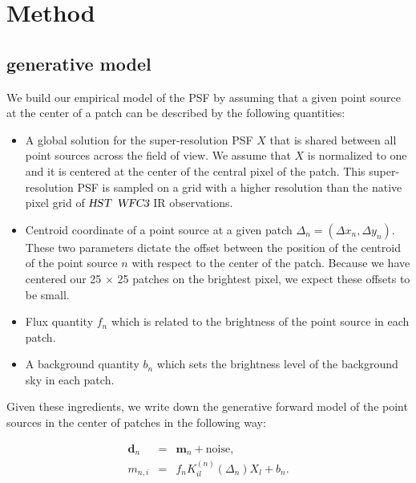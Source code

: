 \clearpage

\section{Method}\label{sec:hstmethod}

\subsection{generative model}

We build our empirical model of the PSF by assuming that a given point source at the center of a patch can be described by 
the following quantities: 

\begin{itemize}
\item A global solution for the super-resolution PSF $X$ that is shared between all point sources across the field of view. We assume 
that $X$ is normalized to one and it is centered at the center of the central pixel of the patch. This super-resolution PSF is sampled on 
a grid with a higher resolution than the native pixel grid of ${\textsl{HST}}$ ${\textsl{WFC3}}$ IR observations.

\item Centroid coordinate of a point source at a given patch $\Delta_n = (\Delta x_n, \Delta y_n)$. 
These two parameters dictate the offset between the position of the centroid of the point source $n$ with 
respect to the center of the patch. Because we have centered our 25 $\times$ 25 patches on the brightest pixel, we expect these offsets to be small.

\item Flux quantity $f_n$ which is related to the brightness of the point source in each patch.

\item A background quantity $b_n$ which sets the brightness level of the background sky in each patch.

\end{itemize}

Given these ingredients, we write down the generative forward model of the point sources in the center of patches in the following way:

\begin{eqnarray} \mathbf{d}_{n} &=& \mathbf{m}_{n} + \mathrm{noise}, \label{eq:model1} \\
       m_{n,i} &=& f_{n}K^{(n)}_{il} (\Delta_n) X_{l} + b_{n}. 
\label{eq:model}
\end{eqnarray} 

